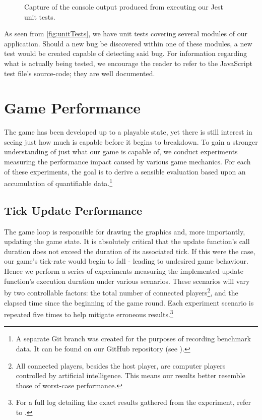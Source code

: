 \documentclass{standalone}
\begin{document}
		\begin{figure}[!htbp]
			\begin{formal}
				
			\end{formal}
			\caption{Capture of the console output produced from executing our Jest unit tests.} \label{fig:unitTests}
		\end{figure}

		As seen from \autoref{fig:unitTests}, we have unit tests covering several modules of our application. Should a new bug be discovered within one of these modules, a new test would be created capable of detecting said bug. For information regarding what is actually being tested, we encourage the reader to refer to the JavaScript test file's source-code; they are well documented.

	\section{Game Performance}
		The game has been developed up to a playable state, yet there is still interest in seeing just how much is capable before it begins to breakdown. To gain a stronger understanding of just what our game is capable of, we conduct experiments measuring the performance impact caused by various game mechanics. For each of these experiments, the goal is to derive a sensible evaluation based upon an accumulation of quantifiable data.\footnote{A separate Git branch was created for the purposes of recording benchmark data. It can be found on our GitHub repository (see ).}

		\subsection{Tick Update Performance} \label{sec:tickUpdatePerformance}
			The game loop is responsible for drawing the graphics and, more importantly, updating the game state. It is absolutely critical that the update function's call duration does not exceed the duration of its associated tick. If this were the case, our game's tick-rate would begin to fall - leading to undesired game behaviour. Hence we perform a series of experiments measuring the implemented update function's execution duration under various scenarios. These scenarios will vary by two controllable factors: the total number of connected players\footnote{All connected players, besides the host player, are computer players controlled by artificial intelligence. This means our results better resemble those of worst-case performance.}, and the elapsed time since the beginning of the game round. Each experiment scenario is repeated five times to help mitigate erroneous results.\footnote{For a full log detailing the exact results gathered from the experiment, refer to .}
\end{document}
